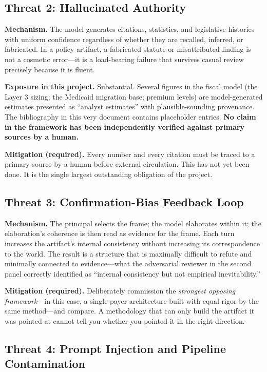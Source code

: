 \documentclass[11pt,a4paper]{article}
\begin{document}
\subsection{Threat 2: Hallucinated Authority}

\textbf{Mechanism.} The model generates citations, statistics, and legislative histories with uniform confidence regardless of whether they are recalled, inferred, or fabricated. In a policy artifact, a fabricated statute or misattributed finding is not a cosmetic error---it is a load-bearing failure that survives casual review precisely because it is fluent.

\textbf{Exposure in this project.} Substantial. Several figures in the fiscal model (the Layer 3 sizing; the Medicaid migration base; premium levels) are model-generated estimates presented as ``analyst estimates'' with plausible-sounding provenance. The bibliography in this very document contains placeholder entries. \textbf{No claim in the framework has been independently verified against primary sources by a human.}

\textbf{Mitigation (required).} Every number and every citation must be traced to a primary source by a human before external circulation. This has not yet been done. It is the single largest outstanding obligation of the project.

\subsection{Threat 3: Confirmation-Bias Feedback Loop}

\textbf{Mechanism.} The principal selects the frame; the model elaborates within it; the elaboration's coherence is then read as evidence for the frame. Each turn increases the artifact's internal consistency without increasing its correspondence to the world. The result is a structure that is maximally difficult to refute and minimally connected to evidence---what the adversarial reviewer in the second panel correctly identified as ``internal consistency but not empirical inevitability.''

\textbf{Mitigation (required).} Deliberately commission the \emph{strongest opposing framework}---in this case, a single-payer architecture built with equal rigor by the same method---and compare. A methodology that can only build the artifact it was pointed at cannot tell you whether you pointed it in the right direction.

\subsection{Threat 4: Prompt Injection and Pipeline Contamination}
\end{document}
